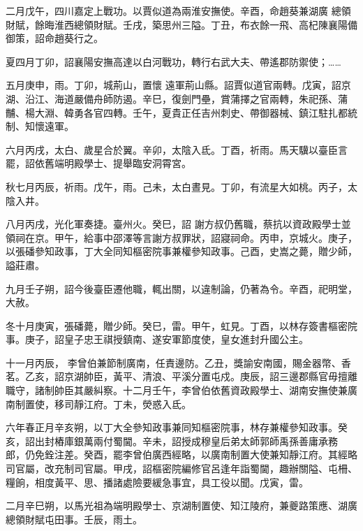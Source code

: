 \begin{pinyinscope}
 二月戊午，四川嘉定上戰功。以賈似道為兩淮安撫使。辛酉，命趙葵兼湖廣
 總領財賦，餘晦淮西總領財賦。壬戌，築思州三隘。丁丑，布衣餘一飛、高杞陳襄陽備御策，詔命趙葵行之。



 夏四月丁卯，詔襄陽安撫高達以白河戰功，轉行右武大夫、帶遙郡防禦使；……



 五月庚申，雨。丁卯，城荊山，置懷
 遠軍荊山縣。詔賈似道官兩轉。戊寅，詔京湖、沿江、海道嚴備舟師防遏。辛巳，復劍門壘，賞蒲擇之官兩轉，朱祀孫、蒲黼、楊大淵、韓勇各官四轉。壬午，夏貴正任吉州刺史、帶御器械、鎮江駐扎都統制、知懷遠軍。



 六月丙戌，太白、歲星合於翼。辛卯，太陰入氐。丁酉，祈雨。馬天驥以臺臣言罷，詔依舊端明殿學士、提舉臨安洞霄宮。



 秋七月丙辰，祈雨。戊午，雨。己未，太白晝見。丁卯，有流星大如桃。丙子，太陰入井。



 八月丙戌，光化軍奏捷。臺州火。癸巳，詔
 謝方叔仍舊職，蔡抗以資政殿學士並領祠在京。甲午，給事中邵澤等言謝方叔罪狀，詔寢祠命。丙申，京城火。庚子，以張磻參知政事，丁大全同知樞密院事兼權參知政事。己酉，史嵩之薨，贈少師，謚莊肅。



 九月壬子朔，詔今後臺臣遷他職，輒出關，以違制論，仍著為令。辛酉，祀明堂，大赦。



 冬十月庚寅，張磻薨，贈少師。癸巳，雷。甲午，虹見。丁酉，以林存簽書樞密院事。庚子，詔皇子忠王祺授鎮南、遂安軍節度使，皇女進封升國公主。



 十一月丙辰，
 李曾伯兼節制廣南，任責邊防。乙丑，獎諭安南國，賜金器幣、香茗。乙亥，詔京湖帥臣，黃平、清浪、平溪分置屯戍。庚辰，詔三邊郡縣官毋擅離職守，諸制帥臣其嚴糾察。十二月壬午，李曾伯依舊資政殿學士、湖南安撫使兼廣南制置使，移司靜江府。丁未，熒惑入氐。



 六年春正月辛亥朔，以丁大全參知政事兼同知樞密院事，林存兼權參知政事。癸亥，詔出封樁庫銀萬兩付蜀閫。辛未，詔授成穆皇后弟太師郭師禹孫善庸承務
 郎，仍免銓注差。癸酉，罷李曾伯廣西經略，以廣南制置大使兼知靜江府。其經略司官屬，改充制司官屬。甲戌，詔樞密院編修官呂逢年詣蜀閫，趣辦關隘、屯柵、糧餉，相度黃平、思、播諸處險要緩急事宜，具工役以聞。戊寅，雷。



 二月辛巳朔，以馬光祖為端明殿學士、京湖制置使、知江陵府，兼夔路策應、湖廣總領財賦屯田事。壬辰，雨土。




\end{pinyinscope}
